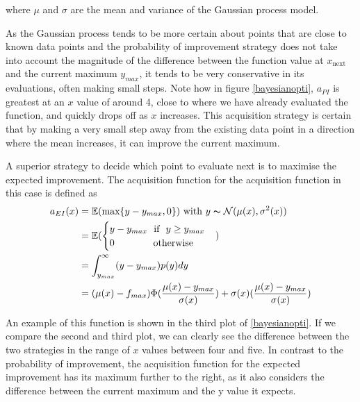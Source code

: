 \documentclass[a4paper,12pt,twoside,openright]{report}
\begin{document}
where $\mu$ and $\sigma$ are the mean and variance of the Gaussian process model.

As the Gaussian process tends to be more certain about points that are close to known data points and the probability of improvement strategy does not take into account the magnitude of the difference between the function value at $x_{\text{next}}$ and the current maximum $y_{max}$, it tends to be very conservative in its evaluations, often making small steps. Note how in figure \ref{bayesianopti}, $a_{PI}$ is greatest at an $x$ value of around 4, close to where we have already evaluated the function, and quickly drops off as $x$ increases. This acquisition strategy is certain that by making a very small step away from the existing data point in a direction where the mean increases, it can improve the current maximum.

A superior strategy to decide which point to evaluate next is to maximise the expected improvement. The acquisition function for the acquisition function in this case is defined \cite{eipaper} as
\begin{align}
a_{EI}(x) &= \mathbb{E}(\text{max}\{y - y_{max}, 0\}) \text{\ with\ } y \thicksim \mathcal{N}(\mu(x),\sigma^2(x))\\
&= \mathbb{E}(\begin{cases}
        y-y_{max} \text{\ \ if\ \ } y \geq y_{max}
        \\
        0 \text{\ \ \ \ \ \ \ \ \ \ \ \ otherwise}
        \end{cases})\\
&= \int_{y_{max}}^\infty (y-y_{max})p(y)dy\\
&= (\mu(x) - f_{max})\Phi(\frac{\mu(x) - y_{max}}{\sigma(x)}) + \sigma(x)(\frac{\mu(x) - y_{max}}{\sigma(x)})
\end{align}

An example of this function is shown in the third plot of \ref{bayesianopti}. If we compare the second and third plot, we can clearly see the difference between the two strategies in the range of $x$ values between four and five. In contrast to the probability of improvement, the acquisition function for the expected improvement has its maximum further to the right, as it also considers the difference between the current maximum and the y value it expects.
\end{document}
